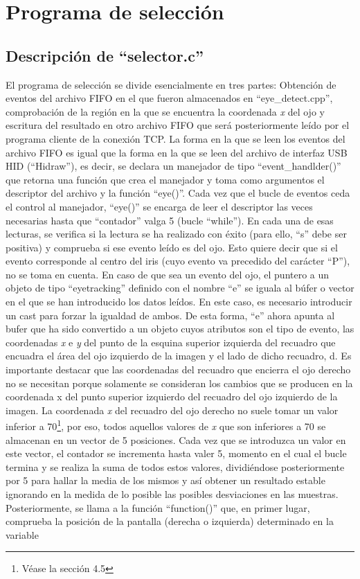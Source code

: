 \section{Programa de selección} \label{s3_4}

\subsection{Descripción de ``selector.c''} \label{s3_4_1}

El programa de selección se divide esencialmente en tres partes: Obtención de eventos del archivo FIFO en el que fueron almacenados en ``eye\_detect.cpp'', comprobación de la región en la que se encuentra la coordenada {\itshape x} del ojo y escritura del resultado en otro archivo FIFO que será posteriormente leído por el programa cliente de la conexión TCP. La forma en la que se leen los eventos del archivo FIFO es igual que la forma en la que se leen del archivo de interfaz USB HID (``Hidraw''), es decir, se declara un manejador de tipo ``event\_handlder()''  que retorna una función que crea el manejador y toma como argumentos el descriptor del archivo y la función ``eye()''. Cada vez que el bucle de eventos ceda el control al manejador, ``eye()'' se encarga de leer el descriptor las veces necesarias hasta que ``contador'' valga 5 (bucle ``while''). En cada una de esas lecturas, se verifica si la lectura se ha realizado con éxito (para ello, ``s'' debe ser positiva) y comprueba si ese evento leído es del ojo. Esto quiere decir que si el evento corresponde al centro del iris (cuyo evento va precedido del carácter ``P''), no se toma en cuenta. En caso de que sea un evento del ojo, el puntero a un objeto de tipo ``eyetracking'' definido con el nombre ``e'' se iguala al búfer o vector en el que se han introducido los datos leídos. En este caso, es necesario introducir un cast para forzar la igualdad de ambos. De esta forma, ``e'' ahora apunta al bufer que ha sido convertido a un objeto cuyos atributos son el tipo de evento, las coordenadas {\itshape x} e {\itshape y} del punto de la esquina superior izquierda del recuadro que encuadra el área del ojo izquierdo de la imagen y el lado de dicho recuadro, d. Es importante destacar que las coordenadas del recuadro que encierra el ojo derecho no se necesitan porque solamente se consideran los cambios que se producen en la coordenada x del punto superior izquierdo del recuadro del ojo izquierdo de la imagen. La coordenada {\itshape x} del recuadro del ojo derecho no suele tomar un valor inferior a 70\footnote{Véase la sección 4.5}, por eso, todos aquellos valores de {\itshape x} que son inferiores a 70 se almacenan en un vector de 5 posiciones. Cada vez que se introduzca un valor en este vector, el contador se incrementa hasta valer 5, momento en el cual el bucle termina y se realiza la suma de todos estos valores, dividiéndose posteriormente por 5 para hallar la media de los mismos y así obtener un resultado estable ignorando en la medida de lo posible las posibles desviaciones en las muestras. Posteriormente, se llama a la función ``function()'' que, en primer lugar, comprueba la posición de la pantalla (derecha o izquierda) determinado en la variable 